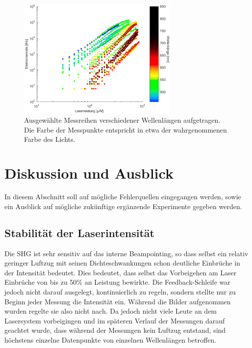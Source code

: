 \documentclass[bachelor,       %
               twoside,        %
               BCOR10mm,       %
               english,ngerman, %
               ]{GAUBM}
\begin{document}
\begin{figure}[h]
	\centering
	\includegraphics[width=0.7\textwidth]{Faecher_Daten}
	\caption{Ausgewählte Messreihen verschiedener Wellenlängen aufgetragen. Die Farbe der Messpunkte entspricht in etwa der wahrgenommenen Farbe des Lichts.}
	\label{fig:regenbogen}
\end{figure}






\chapter{Diskussion und Ausblick}
In diesem Abschnitt soll auf mögliche Fehlerquellen eingegangen werden, sowie ein Ausblick auf mögliche zukünftige ergänzende Experimente gegeben werden.

\section{Stabilit\"at der Laserintensit\"at}
Die SHG ist sehr sensitiv auf das interne Beampointing, so dass selbst ein relativ geringer Luftzug mit seinen Dichteschwankungen schon deutliche Einbrüche in der Intensität bedeutet.
Dies bedeutet, dass selbst das Vorbeigehen am Laser Einbr\"uche von bis zu 50\% an Leistung bewirkte.
Die Feedback-Schleife war jedoch nicht darauf ausgelegt, kontinuierlich zu regeln, sondern stellte nur zu Beginn jeder Messung die Intensit\"at ein.
W\"ahrend die Bilder aufgenommen wurden regelte sie also nicht nach.
Da jedoch nicht viele Leute an dem Lasersystem vorbeigingen und im sp\"ateren Verlauf der Messungen darauf geachtet wurde, dass w\"ahrend der Messungen kein Luftzug entstand, sind h\"ochstens einzelne Datenpunkte von einzelnen Wellenl\"angen betroffen.
\end{document}
